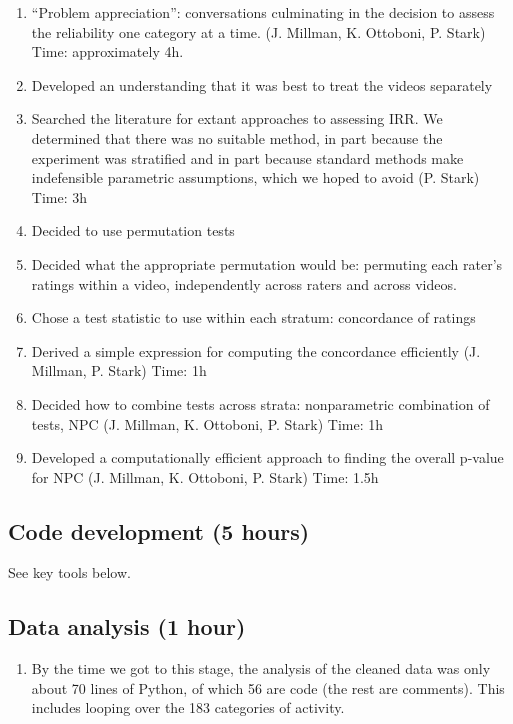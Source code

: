 \documentclass[]{article}
\begin{document}
  \begin{enumerate}
  \def\labelenumii{\roman{enumii}.}
  \itemsep1pt\parskip0pt
  \item
    ``Problem appreciation'': conversations culminating in the decision
    to assess the reliability one category at a time. (J. Millman, K.
    Ottoboni, P. Stark) Time: approximately 4h.
  \item
    Developed an understanding that it was best to treat the videos
    separately
  \item
    Searched the literature for extant approaches to assessing IRR. We
    determined that there was no suitable method, in part because the
    experiment was stratified and in part because standard methods make
    indefensible parametric assumptions, which we hoped to avoid (P.
    Stark) Time: 3h
  \item
    Decided to use permutation tests
  \item
    Decided what the appropriate permutation would be: permuting each
    rater's ratings within a video, independently across raters and
    across videos.
  \item
    Chose a test statistic to use within each stratum: concordance of
    ratings
  \item
    Derived a simple expression for computing the concordance
    efficiently (J. Millman, P. Stark) Time: 1h
  \item
    Decided how to combine tests across strata: nonparametric
    combination of tests, NPC (J. Millman, K. Ottoboni, P. Stark) Time:
    1h
  \item
    Developed a computationally efficient approach to finding the
    overall p-value for NPC (J. Millman, K. Ottoboni, P. Stark) Time:
    1.5h
  \end{enumerate}
  
\subsection{Code development (5 hours)}

See key tools below.
  
\subsection{Data analysis (1 hour)}

  \begin{enumerate}
  \def\labelenumii{\roman{enumii}.}
  \itemsep1pt\parskip0pt
  \item
    By the time we got to this stage, the analysis of the cleaned data
    was only about 70 lines of Python, of which 56 are code (the rest
    are comments). This includes looping over the 183 categories of
    activity.
  \end{enumerate}
\end{document}

